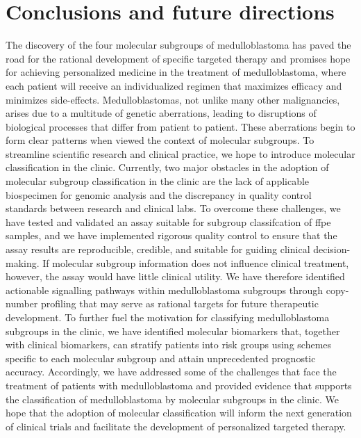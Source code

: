 \chapter{Conclusions and future directions}
\label{ch:conclusions}

The discovery of the four molecular subgroups of medulloblastoma has paved the road for the rational development of specific targeted therapy and promises hope for achieving personalized medicine in the treatment of medulloblastoma, where each patient will receive an individualized regimen that maximizes efficacy and minimizes side-effects. Medulloblastomas, not unlike many other malignancies, arises due to a multitude of genetic aberrations, leading to disruptions of biological processes that differ from patient to patient. These aberrations begin to form clear patterns when viewed the context of molecular subgroups. To streamline scientific research and clinical practice, we hope to introduce molecular classification in the clinic. Currently, two major obstacles in the adoption of molecular subgroup classification in the clinic are the lack of applicable biospecimen for genomic analysis and the discrepancy in quality control standards between research and clinical labs. To overcome these challenges, we have tested and validated an assay suitable for subgroup classifcation of \gls{ffpe} samples, and we have implemented rigorous quality control to ensure that the assay results are reproducible, credible, and suitable for guiding clinical decision-making. If molecular subgroup information does not influence clinical treatment, however, the assay would have little clinical utility. We have therefore identified actionable signalling pathways within medulloblastoma subgroups through copy-number profiling that may serve as rational targets for future therapeutic development. To further fuel the motivation for classifying medulloblastoma subgroups in the clinic, we have identified molecular biomarkers that, together with clinical biomarkers, can stratify patients into risk groups using schemes specific to each molecular subgroup and attain unprecedented prognostic accuracy. Accordingly, we have addressed some of the challenges that face the treatment of patients with medulloblastoma and provided evidence that supports the classification of medulloblastoma by molecular subgroups in the clinic. We hope that the adoption of molecular classification will inform the next generation of clinical trials and facilitate the development of personalized targeted therapy.

